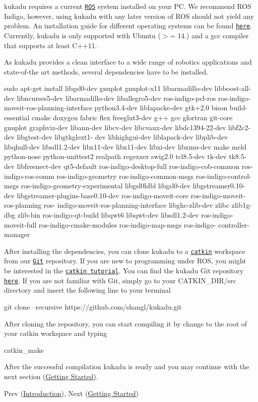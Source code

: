 kukadu requires a current \href{http://www.ros.org/}{\tt R\-O\-S} system installed on your P\-C. We recommend R\-O\-S Indigo, however, using kukadu with any later version of R\-O\-S should not yield any problem. An installation guide for different operating systems can be found \href{http://wiki.ros.org/indigo/Installation}{\tt here}. Currently, kukadu is only supported with Ubuntu ($>$= 14.) and a gcc compiler that supports at least C++11.

As kukadu provides a clean interface to a wide range of robotics applications and state-\/of-\/the art methods, several dependencies have to be installed.


\begin{DoxyCode}
sudo apt-\textcolor{keyword}{get} install libgsl0-dev gnuplot gnuplot-x11 libarmadillo-dev libboost-all-dev libncurses5-dev 
      libarmadillo-dev liballegro5-dev ros-indigo-pcl-ros ros-indigo-moveit-ros-planning-\textcolor{keyword}{interface }python3.4-dev 
      liblapacke-dev gtk+2.0 bison build-essential cmake doxygen fabric flex freeglut3-dev g++ gcc gfortran git-core 
      gnuplot graphviz-dev libann-dev libcv-dev libcvaux-dev libdc1394-22-dev libf2c2-dev libgtest-dev libgtkglext1-
      dev libhighgui-dev liblapack-dev libplib-dev libqhull-dev libsdl1.2-dev libx11-dev libx11-dev libxi-dev 
      libxmu-dev make meld python-nose python-unittest2 realpath regexxer swig2.0 tcl8.5-dev tk-dev tk8.5-dev 
      libfreenect-dev qt5-default ros-indigo-desktop-full ros-indigo-cob-common ros-indigo-ros-comm ros-indigo-geometry 
      ros-indigo-common-msgs ros-indigo-control-msgs ros-indigo-geometry-experimental libgsl0ldbl libgsl0-dev 
      libgstreamer0.10-dev libgstreamer-plugins-base0.10-dev ros-indigo-moveit-core ros-indigo-moveit-ros-planning ros-
      indigo-moveit-ros-planning-interface libghc-zlib-dev zlibc zlib1g-dbg zlib-bin ros-indigo-qt-build libqwt6 
      libqwt-dev libsdl1.2-dev ros-indigo-moveit-full ros-indigo-cmake-modules ros-indigo-map-msgs ros-indigo-
      controller-manager
\end{DoxyCode}


After installing the dependencies, you can clone kukadu to a \href{http://wiki.ros.org/catkin}{\tt catkin} workspace from our \href{https://git-scm.com/}{\tt Git} repository. If you are new to programming under R\-O\-S, you might be interested in the \href{http://wiki.ros.org/catkin/Tutorials}{\tt catkin tutorial}. You can find the kukadu Git repository \href{https://github.com/shangl/kukadu}{\tt here}. If you are not familiar with Git, simply go to your C\-A\-T\-K\-I\-N\-\_\-\-D\-I\-R/src directory and insert the following line to your terminal 
\begin{DoxyCode}
git clone --recursive https:\textcolor{comment}{//github.com/shangl/kukadu.git}
\end{DoxyCode}
 After cloning the repository, you can start compiling it by change to the root of your catkin workspace and typing 
\begin{DoxyCode}
catkin\_make
\end{DoxyCode}
 After the successful compilation kukadu is ready and you may continue with the next section (\hyperlink{gettingstartedpage}{Getting Started}).

Prev (\hyperlink{introductionpage}{Introduction}), Next (\hyperlink{gettingstartedpage}{Getting Started}) 